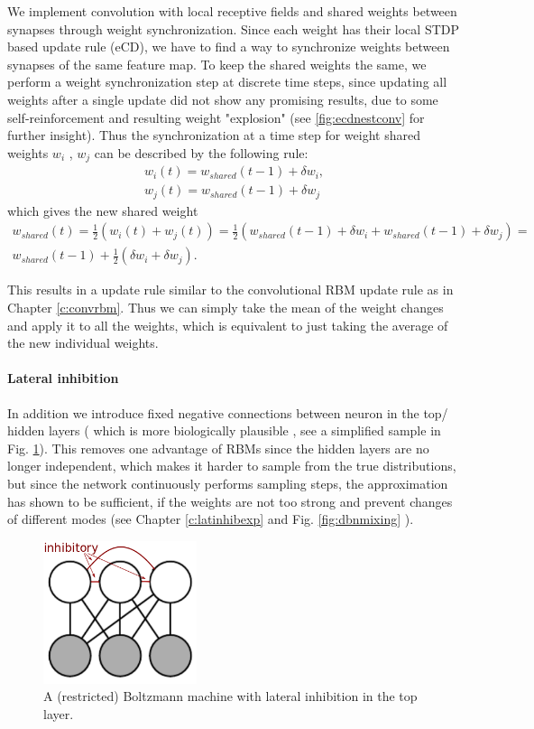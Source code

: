 We implement convolution with local receptive fields and shared weights between synapses through weight synchronization.
Since each weight has their local STDP based update rule (eCD), we have to find a way to synchronize weights between synapses of the same feature map.
To keep the shared weights the same, we perform a weight synchronization step at discrete time steps, since updating all weights after a single update did not show any promising results, due to some self-reinforcement and resulting weight "explosion" (see \ref{fig:ecdnestconv} for further insight).
Thus the synchronization at a time step for weight shared weights $w_i$ , $w_j$ can be described by the following rule:  
\[
\begin{split}
w_i(t) = w_{shared}(t-1) + \delta w_i, \\ 
w_j(t) = w_{shared}(t-1) + \delta w_j 
\end{split}
\]
which gives the new shared weight
\[
\begin{split}
w_{shared}(t) = \frac{1}{2} (w_i(t) + w_j(t) ) = \frac{1}{2} (w_{shared}(t-1) + \delta w_i + w_{shared}(t-1) + \delta w_j) = \\ w_{shared}(t-1) + \frac{1}{2} (\delta w_i + \delta w_j).
\end{split}
\]

This results in a update rule similar to the convolutional RBM update rule as in Chapter \ref{c:convrbm}.
Thus we can simply take the mean of the weight changes and apply it to all the weights, which is equivalent to just taking the average of the new individual weights. 

\paragraph{Lateral inhibition} \label{c:latinhib}
In addition we introduce fixed negative connections between neuron in the top/ hidden layers ( which is more biologically plausible \cite{King2013}, see a simplified sample in Fig. \ref{fig:bminhib}).
This removes one advantage of RBMs since the hidden layers are no longer independent, which makes it harder to sample from the true distributions, but since the network continuously performs sampling steps, the approximation has shown to be sufficient, if the weights are not too strong and prevent changes of different modes (see Chapter \ref{c:latinhibexp} and Fig. \ref{fig:dbnmixing} ).

\begin{figure}
	\centering
    	\includegraphics[width=0.4\textwidth]{imgs/lateral_inhib.png} 
    \caption{A (restricted) Boltzmann machine with lateral inhibition in the top layer.}
	\label{fig:bminhib}
\end{figure}


